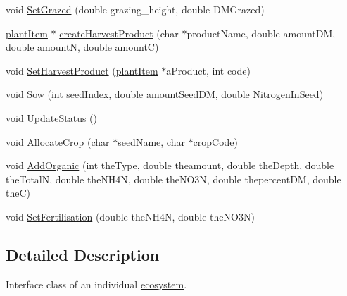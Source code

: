 \begin{DoxyCompactItemize}
\item 
void \hyperlink{classecosystinterface_class_ad4d491d184805cec838e20e55bfd6614}{SetGrazed} (double grazing\_\-height, double DMGrazed)
\item 
\hyperlink{classplant_item}{plantItem} $\ast$ \hyperlink{classecosystinterface_class_a2097c450fa14dbe445cfdc6c8c223b60}{createHarvestProduct} (char $\ast$productName, double amountDM, double amountN, double amountC)
\item 
void \hyperlink{classecosystinterface_class_a0cc6cfd3137d581a9d2247dd5d20193b}{SetHarvestProduct} (\hyperlink{classplant_item}{plantItem} $\ast$aProduct, int code)
\item 
void \hyperlink{classecosystinterface_class_a0b3e023f30976c4ff7d923c8a176880b}{Sow} (int seedIndex, double amountSeedDM, double NitrogenInSeed)
\item 
void \hyperlink{classecosystinterface_class_a2b6e0ede9e2cbeb64b5fd46a751aff17}{UpdateStatus} ()
\item 
void \hyperlink{classecosystinterface_class_a6e82d778908d98c7d1f8049ae69cefcd}{AllocateCrop} (char $\ast$seedName, char $\ast$cropCode)
\item 
void \hyperlink{classecosystinterface_class_acb31d52f537a7bc32344b1df659c43c7}{AddOrganic} (int theType, double theamount, double theDepth, double theTotalN, double theNH4N, double theNO3N, double thepercentDM, double theC)
\item 
void \hyperlink{classecosystinterface_class_a5a1165ff5e89c95550b70b8406ac893f}{SetFertilisation} (double theNH4N, double theNO3N)
\end{DoxyCompactItemize}


\subsection{Detailed Description}
Interface class of an individual \hyperlink{classecosystem}{ecosystem}. 

